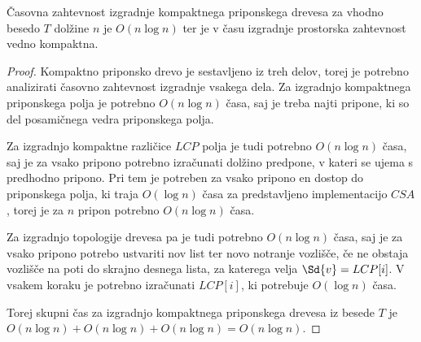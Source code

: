 \begin{izr} \label{izr:izgradnjaCST}
    Časovna zahtevnost izgradnje kompaktnega priponskega drevesa za vhodno besedo $T$ dolžine $n$ je $O(n\log{n})$ ter je v času izgradnje prostorska zahtevnost vedno kompaktna.
\end{izr}

\begin{proof}
    Kompaktno priponsko drevo je sestavljeno iz treh delov, torej je potrebno analizirati časovno zahtevnost izgradnje vsakega dela. Za izgradnjo kompaktnega priponskega polja je potrebno $O(n\log{n})$ časa, saj je treba najti pripone, ki so del posamičnega vedra priponskega polja.
    
    Za izgradnjo kompaktne različice $LCP$ polja je tudi potrebno $O(n\log{n})$ časa, saj je za vsako pripono potrebno izračunati dolžino predpone, v kateri se ujema s predhodno pripono. Pri tem je potreben za vsako pripono en dostop do priponskega polja, ki traja $O(\log{n})$ časa za predstavljeno implementacijo $CSA$, torej je za $n$ pripon potrebno $O(n\log{n})$ časa.

    Za izgradnjo topologije drevesa pa je tudi potrebno $O(n\log{n})$ časa, saj je za vsako pripono potrebo ustvariti nov list ter novo notranje vozlišče, če ne obstaja vozlišče na poti do skrajno desnega lista, za katerega velja $\Sd{v}=LCP[i]$. V vsakem koraku je potrebno izračunati $LCP[i]$, ki potrebuje $O(\log{n})$ časa.

    Torej skupni čas za izgradnjo kompaktnega priponskega drevesa iz besede $T$ je $O(n\log{n})+O(n\log{n})+O(n\log{n})=O(n\log{n})$.
\end{proof}

